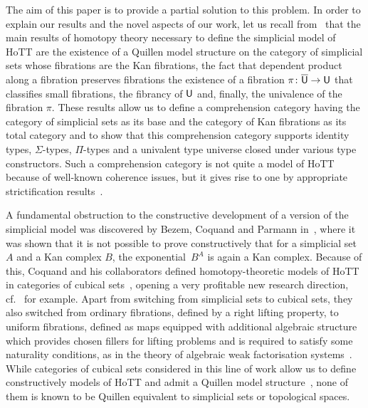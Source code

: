 \documentclass[reqno,10pt,a4paper,oneside,draft]{amsart}
\begin{document}
The aim of this paper is to provide a partial solution to this problem.  In order to
explain our results and the novel aspects of our work, let us recall from~\cite{voevodsky-simplicial-model} that the main results of  homotopy theory necessary 
to define the simplicial model of HoTT are 
the existence of a Quillen
model structure on the category of simplicial sets whose fibrations are the Kan fibrations, 
 the fact that dependent product along a fibration preserves fibrations 
 the existence of a fibration $\pi \colon \overline{\mathsf{U}} \to \mathsf{U}$ that classifies small fibrations, 
the fibrancy of $\mathsf{U}$ and, finally, the univalence of the fibration $\pi$. These results
allow us to define a comprehension category having the category of simplicial sets
as its base and the category of Kan fibrations as its total category
and to show that this comprehension category supports identity types, $\Sigma$-types, $\Pi$-types and a univalent type universe closed under various type
constructors. Such a comprehension category is not quite a 
model of HoTT because of well-known coherence issues, but it gives rise to one
by appropriate strictification results~\cite{voevodsky-simplicial-model,LumsdaineP:locuoc}.



A fundamental obstruction to the constructive development of a version of the simplicial model was discovered by
Bezem, Coquand and Parmann in~\cite{coquand-non-constructivity-kan}, where it was shown that
it is not possible to prove constructively that for a simplicial set $A$ and a
Kan complex $B$, the exponential~$B^A$ is again a Kan complex.
Because of this, Coquand and his collaborators  defined homotopy-theoretic models of HoTT in categories of cubical sets~\cite{coquand-cubical-sets}, opening a very profitable new research direction, cf.~\cite{awodey-cubical,PittsAM:aximct} for example. Apart from switching 
from simplicial sets to cubical sets, they also switched from ordinary fibrations, defined by a right lifting property,
to uniform fibrations, defined as maps equipped with additional algebraic structure which provides
chosen fillers for lifting problems and is required to satisfy some naturality conditions, as in the
theory of algebraic weak factorisation systems~\cite{garner:small-object-argument}. While 
categories of cubical sets considered in this line of work allow us to define constructively models of HoTT 
and admit a Quillen
model structure~\cite{SattlerC:equepu}, none of them
 is known to be Quillen equivalent to simplicial sets or topological spaces.
\end{document}
